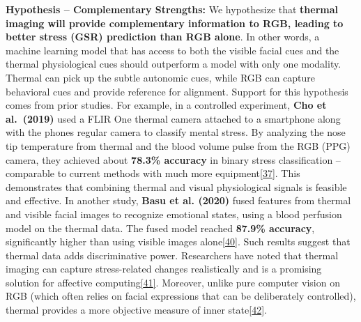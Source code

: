 \documentclass[12pt,a4paper]{article}
\begin{document}
\textbf{Hypothesis -- Complementary Strengths:} We hypothesize that \textbf{thermal imaging will provide complementary information to RGB, leading to better stress (GSR) prediction than RGB alone}. In other words, a machine learning model that has access to both the visible facial cues and the thermal physiological cues should outperform a model with only one modality. Thermal can pick up the subtle autonomic cues, while RGB can capture behavioral cues and provide reference for alignment. Support for this hypothesis comes from prior studies. For example, in a controlled experiment, \textbf{Cho et al.~(2019)} used a FLIR One thermal camera attached to a smartphone along with the phone\textquotesingle s regular camera to classify mental stress. By analyzing the nose tip temperature from thermal and the blood volume pulse from the RGB (PPG) camera, they achieved about \textbf{78.3\% accuracy} in binary stress classification -- comparable to current methods with much more equipment\href{https://www.mdpi.com/2076-3417/10/8/2924\#:~:text=proposed\%20a\%20system\%20consisting\%20of,study\%20by\%20the\%20same\%20authors}{{[}37{]}}. This demonstrates that combining thermal and visual physiological signals is feasible and effective. In another study, \textbf{Basu et al. (2020)} fused features from thermal and visible facial images to recognize emotional states, using a blood perfusion model on the thermal data. The fused model reached \textbf{87.9\% accuracy}, significantly higher than using visible images alone\href{https://www.mdpi.com/2076-3417/10/8/2924\#:~:text=challenging\%20purpose\%20of\%20classifying\%20personality,87}{{[}40{]}}. Such results suggest that thermal data adds discriminative power. Researchers have noted that thermal imaging can capture stress-related changes realistically and is a promising solution for affective computing\href{https://www.techscience.com/CMES/v130n2/45961/html\#:~:text=Human\%20Stress\%20Recognition\%20from\%20Facial,stress\%20detection\%20in\%20a}{{[}41{]}}. Moreover, unlike pure computer vision on RGB (which often relies on facial expressions that can be deliberately controlled), thermal provides a more objective measure of inner state\href{https://www.mdpi.com/2076-3417/10/8/2924\#:~:text=primarily\%20use\%20visual\%20information\%20for,obtrusive}{{[}42{]}}.
\end{document}
